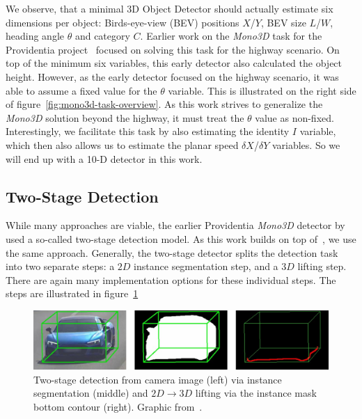 We observe, that a minimal 3D Object Detector should actually estimate six dimensions per object: Birds-eye-view (BEV) positions $X$/$Y$, BEV size $L$/$W$, heading angle $\theta$ and category $C$.
Earlier work on the \textit{Mono3D} task for the Providentia project~\cite{leonthesis} focused on solving this task for the highway scenario.
On top of the minimum six variables, this early detector also calculated the object height.
However, as the early detector focused on the highway scenario, it was able to assume a fixed value for the $\theta$ variable.
This is illustrated on the right side of figure~\ref{fig:mono3d-task-overview}.
As this work strives to generalize the \textit{Mono3D} solution beyond the highway, it must treat the $\theta$ value as non-fixed.
Interestingly, we facilitate this task by also estimating the identity $I$ variable, which then also allows us to estimate the planar speed $\delta X$/$\delta Y$ variables.
So we will end up with a 10-D detector in this work.

\subsection{Two-Stage Detection}
\label{subsec:twostage}

While many approaches are viable, the earlier Providentia \textit{Mono3D} detector by~\cite{leonthesis} used a so-called two-stage detection model.
As this work builds on top of~\cite{leonthesis}, we use the same approach.
Generally, the two-stage detector splits the detection task into two separate steps: a $2D$ instance segmentation step, and a $3D$ lifting step.
There are again many implementation options for these individual steps.
The steps are illustrated in figure~\ref{fig:mono3d-two-stage}

\begin{figure}[htb]
    \includegraphics[width=\linewidth]{figures/two-stage-detection}
    \caption{Two-stage detection from camera image (left) via instance segmentation (middle) and $2D \rightarrow 3D$ lifting via the instance mask bottom contour (right). Graphic from~\cite{leonthesis}.}
    \label{fig:mono3d-two-stage}
\end{figure}

